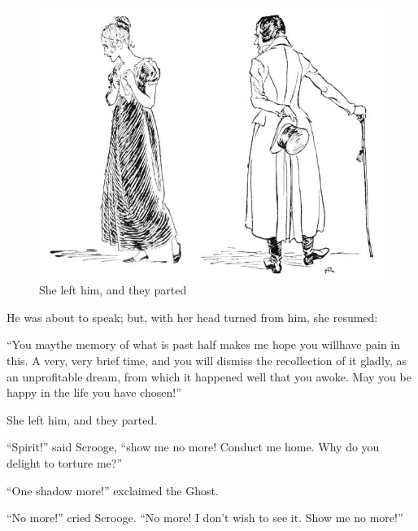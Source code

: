\documentclass[paper=5.5in:8.5in,BCOR=5mm,twoside,DIV=calc,12pt,usegeometry]{scrbook} %
\begin{document}
\begin{figure}[tbh]
\begin{minipage}[c]{\linewidth}
\includegraphics[width=\linewidth]{gs081}
\caption*{She left him, and they parted}
\end{minipage}
\end{figure}

He was about to speak; but, with her head turned from him, she resumed:

\enquote{You may\textemdash the memory of what is past half makes me hope you will\textemdash have pain in this. A very, very brief time, and you will dismiss the recollection of it gladly, as an unprofitable dream, from which it happened well that you awoke. May you be happy in the life you have chosen!}

She left him, and they parted.

\enquote{Spirit!} said Scrooge, \enquote{show me no more! Conduct me home. Why do you delight to torture me?}

\enquote{One shadow more!} exclaimed the Ghost.

\enquote{No more!} cried Scrooge. \enquote{No more! I don't wish to see it. Show me no more!}
\end{document}
